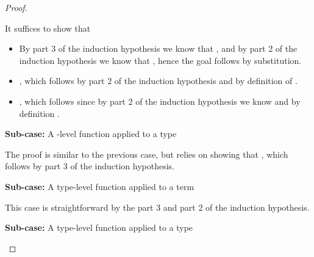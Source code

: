 {\begin{proof}
\begin{proofcases}
\begin{proofcases}
    It suffices to show that
    \begin{itemize}
      \item \im{\cpstyjudg{\slenv^+}{\subst{\sB^+}{\setwo^{\div}}{\cpsx}}{\cpsK}}
        By part 3 of the induction hypothesis we know that
        \im{\cpstyjudg{\slenv^+,\cpsx:\sA^\div}{\sB^+}{\cpsK}}, and by part 2 of the induction
        hypothesis we know that \im{\cpstyjudg{\slenv^+}{\setwo^{\div}}{\sA^{\div}}}, hence the
        goal follows by substitution.
      \item
        \im{\cpstyjudg{\slenv^+}{\seone^\div}{\cpspity{\cpsalpha}{\cpsstarty}{\cpsfunty{(\cpsfunty{\cpspity{\cpsx}{\sA^{\div}}{\sB^\div}}{\cpsalpha})}{\cpsalpha}}}},
        which follows by part 2 of the induction hypothesis and by definition of \im{(\spity{\sx}{\sA}{\sB})^{\div}}.
      \item \im{\cpstyjudg{\slenv^+,\cpsalpha:\cpsstarty,\cpsk:\cpsfunty{(\subst{\sB^+}{\setwo^{\div}}{\cpsx})}{\cpsalpha}}{(\cpsfune{\cpsf}{\cpspity{\cpsx}{\sA^{\div}}{\sB^{\div}}}{
                  \cpsncappe{(\cpsappe{\cpsf}{\setwo^{\div}})}{\cpsalpha}{\cpsk}})}{\cpsfunty{\cpspity{\cpsx}{\sA^{\div}}{\sB^\div}}{\cpsalpha}}},
            which follows since by part 2 of the induction hypothesis \im{\setwo^\div:\sA^\div} we
            know \im{(\cpsappe{\cpsf}{\setwo^{\div}}) : \subst{\sB^{\div}}{\setwo^\div}{\cpsx}}
            and by definition \im{\subst{\sB^{\div}}{\setwo^\div}{\cpsx} = \cpspity{\cpsalpha}{\cpsstarty}{\cpsfunty{(\cpsfunty{\subst{\sB^+}{\setwo^{\div}}{\cpsx}}{\cpsalpha})}{\cpsalpha}}}.
    \end{itemize}

    \item[{\bfseries Sub-case:}] A -level function applied to a type \im{\styjudg{\slenv}{\sappe{\seone}{\sA}}{\subst{\sB}{\sA}{\salpha}}}

    The proof is similar to the previous case, but relies on showing that
    \im{\cpstyjudg{\slenv^+}{\sA^+}{\sK^+}}, which follows by part 3 of the induction hypothesis.

    \item[{\bfseries Sub-case:}] A type-level function applied to a term \im{\styjudg{\slenv}{\sappe{\sA}{\se}}{\subst{\sK}{\se}{\sx}}}

    This case is straightforward by the part 3 and part 2 of the induction hypothesis.

    \item[{\bfseries Sub-case:}] A type-level function applied to a type \im{\styjudg{\slenv}{\sappe{\sA}{\sB}}{\subst{\sK}{\sB}{\salpha}}}


\end{proofcases}
\end{proofcases}
\end{proof}}
